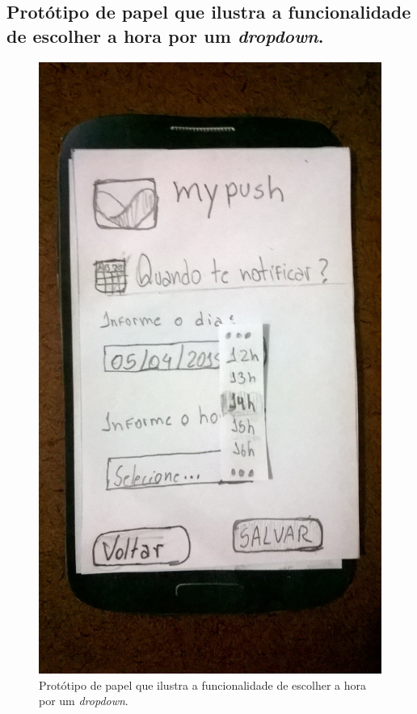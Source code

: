 \begin{apendicesenv}
    \pagebreak
    \section*{Protótipo de papel que ilustra a funcionalidade de escolher a hora por um \textit{dropdown}.}
    
      \begin{figure}[!htbp]
	\centering
	\includegraphics[scale=0.32, angle=-90]{editaveis/figuras/prototipo_papel_v1/quando_notificar_horario}
	\caption{Protótipo de papel que ilustra a funcionalidade de escolher a hora por um \textit{dropdown}.}
	\label{quando_notificar_horario_v1}
      \end{figure}
      

\end{apendicesenv}
